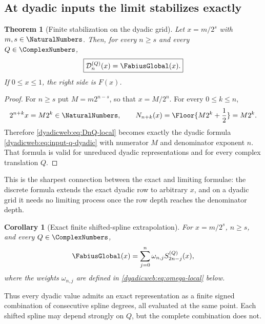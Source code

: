\documentclass[11pt,oneside]{article}
\newtheorem{theorem}{Theorem}[section]
\newtheorem{corollary}[corollary]{Corollary}
\theoremstyle{definition}
\theoremstyle{remark}
\begin{document}
\subsection{At dyadic inputs the limit stabilizes exactly}

\begin{theorem}[Finite stabilization on the dyadic grid]
\label{dyadicweb:thm:dyadic-stabilization}
Let $x=m/2^s$ with $m,s\in\NaturalNumbers$.  Then, for every $n\ge s$ and every $Q\in\ComplexNumbers$,
\begin{equation}
 \boxed{\mathcal D_n^{(Q)}(x)=\FabiusGlobal(x).}              \label{dyadicweb:eq:dyadic-stabilization}
\end{equation}
If $0\le x\le1$, the right side is $F(x)$.
\end{theorem}

\begin{proof}
For $n\ge s$ put $M=m2^{n-s}$, so that $x=M/2^n$.  For every $0\le k\le n$,
\[
 2^{n+k}x=M2^k\in\NaturalNumbers,
 \qquad
 N_{n+k}(x)=\Floor{M2^k+\frac12}=M2^k.
\]
Therefore \eqref{dyadicweb:eq:DnQ-local} becomes exactly the dyadic formula
\eqref{dyadicweb:eq:input-q-dyadic} with numerator $M$ and denominator exponent $n$.  That formula is
valid for unreduced dyadic representations and for every complex translation $Q$.
\end{proof}

This is the sharpest connection between the exact and limiting formulae: the discrete formula
extends the exact dyadic row to arbitrary $x$, and on a dyadic grid it needs no limiting
process once the row depth reaches the denominator depth.

\begin{corollary}[Exact finite shifted-spline extrapolation]
\label{dyadicweb:cor:exact-shifted-extrapolation}
For $x=m/2^s$, $n\ge s$, and every $Q\in\ComplexNumbers$,
\begin{equation}
 \FabiusGlobal(x)=\sum_{j=0}^{n}\omega_{n,j}
 S_{2n-j}^{(Q)}(x),                                       \label{dyadicweb:eq:exact-shifted-extrapolation}
\end{equation}
where the weights $\omega_{n,j}$ are defined in
\eqref{dyadicweb:eq:omega-local} below.
\end{corollary}

Thus every dyadic value admits an exact representation as a finite signed combination of
consecutive spline degrees, all evaluated at the same point.  Each shifted spline may depend
strongly on $Q$, but the complete combination does not.
\end{document}
